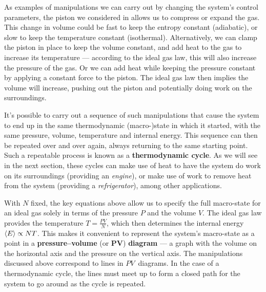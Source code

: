 As examples of manipulations we can carry out by changing the system's control parameters, the piston we considered in  allows us to compress or expand the gas.
This change in volume could be fast to keep the entropy constant (adiabatic), or slow to keep the temperature constant (isothermal).
Alternatively, we can clamp the piston in place to keep the volume constant, and add heat to the gas to increase its temperature --- according to the ideal gas law, this will also increase the pressure of the gas.
Or we can add heat while keeping the pressure constant by applying a constant force to the piston.
The ideal gas law then implies the volume will increase, pushing out the piston and potentially doing work on the surroundings.

It's possible to carry out a sequence of such manipulations that cause the system to end up in the same thermodynamic (macro-)state in which it started, with the same pressure, volume, temperature and internal energy. %
This sequence can then be repeated over and over again, always returning to the same starting point.
Such a repeatable process is known as a \textbf{thermodynamic cycle}.
As we will see in the next section, these cycles can make use of heat to have the system do work on its surroundings (providing an \textit{engine}), or make use of work to remove heat from the system (providing a \textit{refrigerator}), among other applications.

With $N$ fixed, the key equations above allow us to specify the full macro-state for an ideal gas solely in terms of the pressure $P$ and the volume $V$.
The ideal gas law provides the temperature $T = \frac{PV}{N}$, which then determines the internal energy $\left\langle E \right\rangle \propto NT$.
This makes it convenient to represent the system's macro-state as a point in a \textbf{pressure--volume} (or $\mathbf{PV}$) \textbf{diagram} --- a graph with the volume on the horizontal axis and the pressure on the vertical axis.
The manipulations discussed above correspond to lines in $PV$~diagrams.
In the case of a thermodynamic cycle, the lines must meet up to form a closed path for the system to go around as the cycle is repeated.

